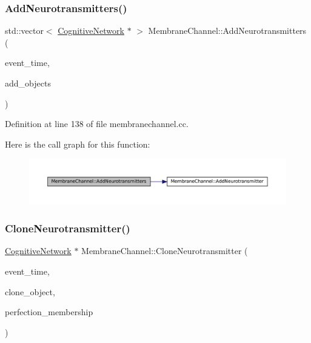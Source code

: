 \subsubsection{\texorpdfstring{Add\+Neurotransmitters()}{AddNeurotransmitters()}}
{\footnotesize\ttfamily std\+::vector$<$ \mbox{\hyperlink{class_cognitive_network}{Cognitive\+Network}} $\ast$ $>$ Membrane\+Channel\+::\+Add\+Neurotransmitters (\begin{DoxyParamCaption}\item[{std\+::chrono\+::time\+\_\+point$<$ \mbox{\hyperlink{universe_8h_a0ef8d951d1ca5ab3cfaf7ab4c7a6fd80}{Clock}} $>$}]{event\+\_\+time,  }\item[{std\+::vector$<$ \mbox{\hyperlink{class_cognitive_network}{Cognitive\+Network}} $\ast$$>$}]{add\+\_\+objects }\end{DoxyParamCaption})}



Definition at line 138 of file membranechannel.\+cc.

Here is the call graph for this function\+:\nopagebreak
\begin{figure}[H]
\begin{center}
\leavevmode
\includegraphics[width=350pt]{class_membrane_channel_a01fb5f3176cfa3423bb10a04bf69da01_cgraph}
\end{center}
\end{figure}
\mbox{\label{class_membrane_channel_af667720bd2214ea3a1e6d272b57d3a79}} 
\subsubsection{\texorpdfstring{Clone\+Neurotransmitter()}{CloneNeurotransmitter()}}
{\footnotesize\ttfamily \mbox{\hyperlink{class_cognitive_network}{Cognitive\+Network}} $\ast$ Membrane\+Channel\+::\+Clone\+Neurotransmitter (\begin{DoxyParamCaption}\item[{std\+::chrono\+::time\+\_\+point$<$ \mbox{\hyperlink{universe_8h_a0ef8d951d1ca5ab3cfaf7ab4c7a6fd80}{Clock}} $>$}]{event\+\_\+time,  }\item[{\mbox{\hyperlink{class_cognitive_network}{Cognitive\+Network}} $\ast$}]{clone\+\_\+object,  }\item[{double}]{perfection\+\_\+membership }\end{DoxyParamCaption})}




